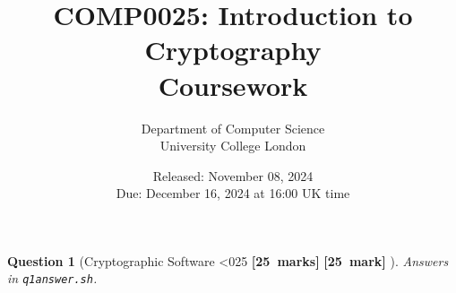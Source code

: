 \documentclass[a4paper]{article}
\theoremstyle{que}
\newtheorem{question}{Question}
\newcommand\points[1]{%
\ifnum1<0#1\relax%
    {\bf \small [#1~marks]}%
  \else%
    {\bf \small [#1~mark]}%
  \fi%
}%
\newcommand{\module}{COMP0025: Introduction to Cryptography}
\newcommand{\university}{Department of Computer Science \\[0.15cm] University College London}
\newcommand{\assessment}{Coursework}
\newcommand{\releaseDate}{November 08, 2024}
\newcommand{\dueDate}{December 16, 2024 at 16:00 UK time}
\begin{document}
\title{\module\\[0.25cm]\assessment}
\author{\university}
\date{Released: \releaseDate\\[0.25cm]Due: \dueDate}
\maketitle

\newpage


\begin{question}[Cryptographic Software \points{25}]
  Answers in \texttt{q1answer.sh}.
\end{question}

\newpage

\end{document}
